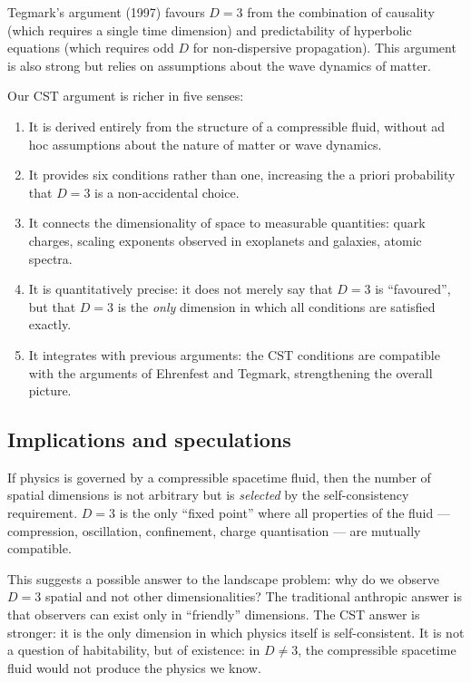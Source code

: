 \documentclass[10pt,a4paper]{article}
\begin{document}
Tegmark's argument (1997) favours $D = 3$ from the combination of causality (which requires a single time dimension) and predictability of hyperbolic equations (which requires odd $D$ for non-dispersive propagation). This argument is also strong but relies on assumptions about the wave dynamics of matter.

Our CST argument is richer in five senses:
\begin{enumerate}
\item It is derived entirely from the structure of a compressible fluid, without ad hoc assumptions about the nature of matter or wave dynamics.
\item It provides six conditions rather than one, increasing the a priori probability that $D = 3$ is a non-accidental choice.
\item It connects the dimensionality of space to measurable quantities: quark charges, scaling exponents observed in exoplanets and galaxies, atomic spectra.
\item It is quantitatively precise: it does not merely say that $D = 3$ is ``favoured'', but that $D = 3$ is the \textit{only} dimension in which all conditions are satisfied exactly.
\item It integrates with previous arguments: the CST conditions are compatible with the arguments of Ehrenfest and Tegmark, strengthening the overall picture.
\end{enumerate}

\subsection{Implications and speculations}

If physics is governed by a compressible spacetime fluid, then the number of spatial dimensions is not arbitrary but is \textit{selected} by the self-consistency requirement. $D = 3$ is the only ``fixed point'' where all properties of the fluid --- compression, oscillation, confinement, charge quantisation --- are mutually compatible.

This suggests a possible answer to the landscape problem: why do we observe $D = 3$ spatial and not other dimensionalities? The traditional anthropic answer is that observers can exist only in ``friendly'' dimensions. The CST answer is stronger: it is the only dimension in which physics itself is self-consistent. It is not a question of habitability, but of existence: in $D \neq 3$, the compressible spacetime fluid would not produce the physics we know.
\end{document}
